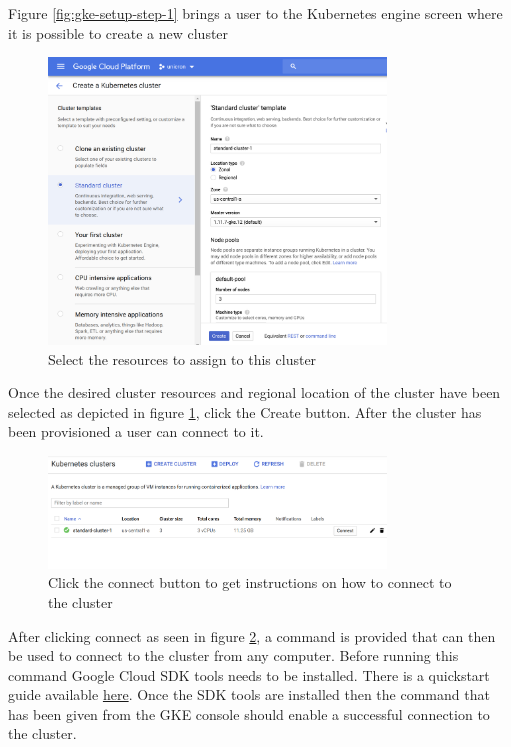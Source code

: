 \FloatBarrier

Figure \ref{fig:gke-setup-step-1} brings a user to the Kubernetes engine screen where it is possible to create a new cluster

\begin{figure}[!h]
  \centering
    \includegraphics[width=0.8\textwidth]{figures/gke-setup-2.png}
    \caption{Select the resources to assign to this cluster}
    \label{fig:gke-setup-step-2}
\end{figure}

\FloatBarrier

Once the desired cluster resources and regional location of the cluster have been selected as depicted in figure \ref{fig:gke-setup-step-2}, click the Create button. After the cluster has been provisioned a user can connect to it. 

\begin{figure}[!h]
  \centering
    \includegraphics[width=0.8\textwidth]{figures/gke-setup-3.png}
    \caption{Click the connect button to get instructions on how to connect to the cluster}
    \label{fig:gke-setup-step-3}
\end{figure}

\FloatBarrier

After clicking connect as seen in figure \ref{fig:gke-setup-step-3}, a command is provided that can then be used to connect to the cluster from any computer. Before running this command Google Cloud SDK tools needs to be installed. There is a quickstart guide available
\href{https://cloud.google.com/sdk/docs/quickstart-linux}{here}. Once the SDK tools are installed then the command that has been given from the GKE console should enable a successful connection to the cluster.

